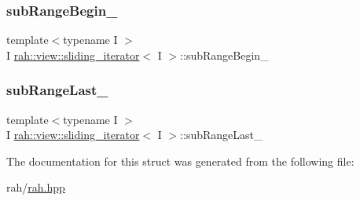 \subsubsection{\texorpdfstring{subRangeBegin\_}{subRangeBegin\_}}
{\footnotesize\ttfamily template$<$typename I $>$ \\
I \mbox{\hyperlink{structrah_1_1view_1_1sliding__iterator}{rah\+::view\+::sliding\+\_\+iterator}}$<$ I $>$\+::sub\+Range\+Begin\+\_\+}

\mbox{\label{structrah_1_1view_1_1sliding__iterator_a6ad809caec4abec1b0248c86c72c5087}} 
\subsubsection{\texorpdfstring{subRangeLast\_}{subRangeLast\_}}
{\footnotesize\ttfamily template$<$typename I $>$ \\
I \mbox{\hyperlink{structrah_1_1view_1_1sliding__iterator}{rah\+::view\+::sliding\+\_\+iterator}}$<$ I $>$\+::sub\+Range\+Last\+\_\+}



The documentation for this struct was generated from the following file\+:\begin{DoxyCompactItemize}
\item 
rah/\mbox{\hyperlink{rah_8hpp}{rah.\+hpp}}\end{DoxyCompactItemize}
